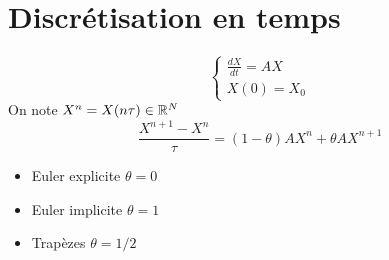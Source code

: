 \documentclass[openany]{book}
\begin{document}
\section{Discr\'etisation en temps}
\begin{equation}
\left\{
  \begin{array}{ll}
		  \frac{d X}{dt} = A X \\
		  X(0) = X_0
  \end{array}
\right.
\end{equation}
On note $X^n = X(n\tau) \in \mathbb{R}^N$
$$
\frac{X^{n+1} - X^n}{\tau} = (1-\theta)AX^n + \theta A X^{n+1}
$$
\begin{itemize}
		\item Euler explicite $\theta = 0$
		\item Euler implicite $\theta = 1$
		\item Trap\`ezes $\theta = 1/2$
\end{itemize}
\bigskip
\end{document}
